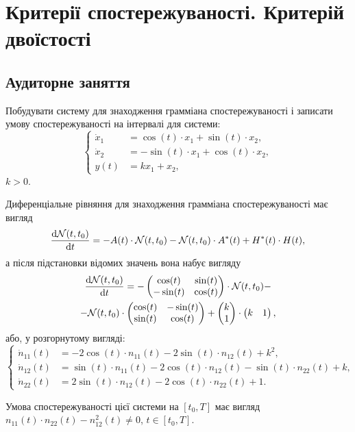 
\section{Критерії спостережуваності. Критерій двоїстості}

\subsection*{Аудиторне заняття}

\begin{problem}
	Побудувати систему для знаходження грамміана спостережуваності і записати умову спостережуваності на інтервалі для системи: \[
	\left\{
		\begin{aligned}
			\dot x_1 &= \cos(t) \cdot x_1 + \sin(t) \cdot x_2, \\
			\dot x_2 &= - \sin(t) \cdot x_1 + \cos(t) \cdot x_2, \\
			y(t) &= k x_1 + x_2,
		\end{aligned}
	\right.
	\]
	$k > 0$.
\end{problem}

\begin{solution}
	Диференціальне рівняння для знаходження грамміана спостережуваності має вигляд \[ \frac{\mathop{}\!\mathrm{d} \mathcal{N}(t, t_0)}{\mathop{}\!\mathrm{d} t} = -A(t) \cdot \mathcal{N}(t, t_0) - \mathcal{N}(t, t_0) \cdot A^*(t) + H^*(t) \cdot H(t), \] а після підстановки відомих значень вона набує вигляду \begin{multline*} 
		\frac{\mathop{}\!\mathrm{d} \mathcal{N}(t, t_0)}{\mathop{}\!\mathrm{d} t} = -\begin{pmatrix} \cos (t) & \sin(t) \\ - \sin(t) & \cos(t) \end{pmatrix} \cdot \mathcal{N}(t, t_0) - \\
		- \mathcal{N}(t, t_0) \cdot \begin{pmatrix} \cos (t) & -\sin(t) \\ \sin(t) & \cos(t) \end{pmatrix} + \begin{pmatrix} k \\ 1 \end{pmatrix} \cdot \begin{pmatrix} k & 1 \end{pmatrix}, 
	\end{multline*} або, у розгорнутому вигляді: \[
	\left\{
		\begin{aligned}
			\dot n_{11} (t) &= - 2 \cos(t) \cdot n_{11} (t) - 2 \sin(t) \cdot n_{12} (t) + k^2, \\
			\dot n_{12} (t) &= \sin (t) \cdot n_{11} (t) - 2\cos(t) \cdot n_{12} (t) - \sin (t) \cdot n_{22} (t) + k, \\
			\dot n_{22} (t) &= 2 \sin(t) \cdot n_{12} (t) - 2 \cos(t) \cdot n_{22} (t) + 1.
		\end{aligned}
	\right.
	\]

	Умова спостережуваності цієї системи на $[t_0, T]$ має вигляд  $n_{11} (t) \cdot n_{22} (t) - n_{12}^2 (t) \ne 0$, $t \in [t_0, T]$.
\end{solution}

